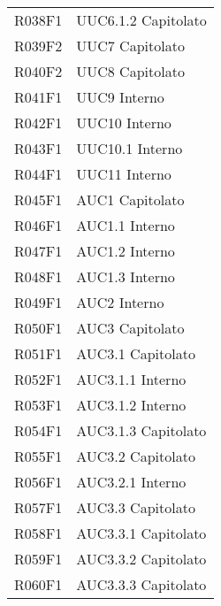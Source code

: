 \documentclass[../analisi-dei-requisiti.tex]{subfiles}
\begin{document}
\begin{longtable}[H]{ p{4cm} | p{4cm} }
  R038F1                               & UUC6.1.2 Capitolato           \\
  R039F2                               & UUC7 Capitolato               \\
  R040F2                               & UUC8 Capitolato               \\
  R041F1                               & UUC9 Interno                  \\
  R042F1                               & UUC10 Interno                 \\
  R043F1                               & UUC10.1 Interno               \\
  R044F1                               & UUC11 Interno                 \\
  R045F1                               & AUC1 Capitolato               \\
  R046F1                               & AUC1.1 Interno                \\
  R047F1                               & AUC1.2 Interno                \\
  R048F1                               & AUC1.3 Interno                \\
  R049F1                               & AUC2 Interno                  \\
  R050F1                               & AUC3 Capitolato               \\
  R051F1                               & AUC3.1 Capitolato             \\
  R052F1                               & AUC3.1.1 Interno              \\
  R053F1                               & AUC3.1.2 Interno              \\
  R054F1                               & AUC3.1.3 Capitolato           \\
  R055F1                               & AUC3.2 Capitolato             \\
  R056F1                               & AUC3.2.1 Interno              \\
  R057F1                               & AUC3.3 Capitolato             \\
  R058F1                               & AUC3.3.1 Capitolato           \\
  R059F1                               & AUC3.3.2 Capitolato           \\
  R060F1                               & AUC3.3.3 Capitolato           \\

\end{longtable}
\end{document}
